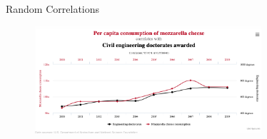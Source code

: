 \documentclass[12pt, aspectratio=169]{beamer}
\begin{document}
\begin{frame}{Random Correlations}
  \centering
  \begin{figure}
    \includegraphics[width=0.75\textwidth]{correlations1.png}
  \end{figure}

            
\end{frame}
\end{document}

